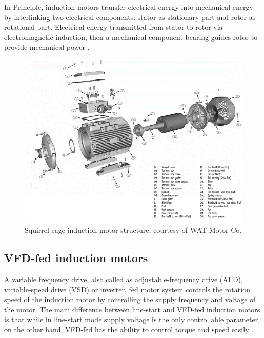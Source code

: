 In Principle, induction motors transfer electrical energy into mechanical energy by interlinking two electrical components: stator as stationary part and rotor as rotational part. Electrical energy transmitted from stator to rotor via electromagnetic induction, then a mechanical component bearing guides rotor to provide mechanical power \cite{oliver1992electric,karmakar2016induction}.

\begin{figure}[h]
	\centering
	\includegraphics[width=350pt,keepaspectratio=true]{./fig/watmotor.PNG}
	\caption{Squirrel cage induction motor structure, courtesy of WAT Motor Co.}	
	\label{motor}
\end{figure}

\subsection{VFD-fed induction motors}

A variable frequency drive, also called as adjustable-frequency drive (AFD), variable-speed drive (VSD) or inverter, fed motor system controls the rotation speed of the induction motor by controlling the supply frequency and voltage of the motor. The main difference between line-start and VFD-fed induction motors is that while in line-start mode supply voltage is the only controllable parameter, on the other hand, VFD-fed has the ability to control torque and speed easily \cite{faiz2017fault}.

